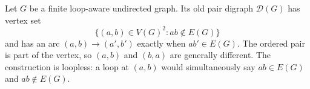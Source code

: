 \begin{definition}
Let $G$ be a finite loop-aware undirected graph.  Its old pair digraph
$\mathcal D(G)$ has vertex set
\[
 \{(a,b)\in V(G)^2:ab\notin E(G)\}
\]
and has an arc $(a,b)\to(a',b')$ exactly when $ab'\in E(G)$.  The ordered
pair is part of the vertex, so $(a,b)$ and $(b,a)$ are generally different.
The construction is loopless: a loop at $(a,b)$ would simultaneously say
$ab\in E(G)$ and $ab\notin E(G)$.
\end{definition}
